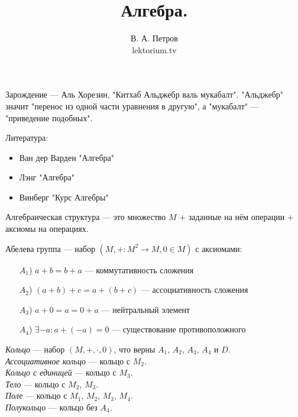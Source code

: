 \documentclass[12pt,a4paper]{article}
\title{Алгебра.}
\author{В. А. Петров\\lektorium.tv}
\date{}
\begin{document}
    \maketitle

    Зарождение --- Аль Хорезин, "Китхаб Альджебр валь мукабалт". "Альджебр" значит "перенос из одной части уравнения в другую", а "мукабалт" --- "приведение подобных".

    Литература:
    \begin{itemize}
        \item Ван дер Варден "Алгебра"
        \item Лэнг "Алгебра"
        \item Винберг "Курс Алгебры"
    \end{itemize}

    \begin{definition}
        Алгебраическая структура --- это множество $M$ + заданные на нём операции + аксиомы на операциях.
    \end{definition}

    \begin{definition}
        Абелева группа --- набор $(M, +: M^2 \to M, 0 \in M)$ с аксиомами:
        \begin{itemize}
            \item[$A_1$)] $a + b = b + a$ --- коммутативность сложения
            \item[$A_2$)] $(a + b) + c = a + (b + c)$ --- ассоциативность сложения
            \item[$A_3$)] $a + 0 = a = 0 + a$ --- нейтральный элемент
            \item[$A_4$)] $\exists -a: a + (-a) = 0$ --- существование противоположного
        \end{itemize}
    \end{definition}

    \begin{definition}
        \emph{Кольцо} --- набор $(M, +, \cdot, 0)$, что верны $A_1$, $A_2$, $A_3$, $A_4$ и $D$.\\
        \emph{Ассоциативное кольцо} --- кольцо с $M_2$.\\
        \emph{Кольцо с единицей} --- кольцо с $M_3$.\\
        \emph{Тело} --- кольцо с $M_2$, $M_3$.\\
        \emph{Поле} --- кольцо с $M_1$, $M_2$, $M_3$, $M_4$.\\
        \emph{Полукольцо} --- кольцо без $A_4$.
    \end{definition}
\end{document}
